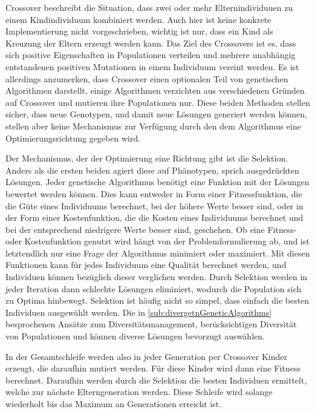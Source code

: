 Crossover beschreibt die Situation, dass zwei oder mehr Elternindividuuen zu einem Kindindividuum kombiniert werden. 
Auch hier ist keine konkrete Implementierung nicht vorgeschrieben, wichtig ist nur, dass ein Kind als Kreuzung der Eltern erzeugt werden kann.
Das Ziel des Crossovers ist es, dass sich positive Eigenschaften in Populationen verteilen und mehrere unabhängig entstandenen positiven Mutationen in einem Individuum vereint werden.
Es ist allerdings anzumerken, dass Crossover einen optionalen Teil von genetischen Algorithmen darstellt, einige Algorithmen%
verzichten aus verschiedenen Gründen auf Crossover und mutieren ihre Populationen nur.
Diese beiden Methoden stellen sicher, dass neue Genotypen, und damit neue Lösungen generiert werden können, stellen aber keine Mechanismus zur Verfügung durch den dem Algorithmus eine Optimierungsrichtung gegeben wird.

Der Mechanismus, der der Optimierung eine Richtung gibt ist die Selektion.
Anders als die ersten beiden agiert diese auf Phänotypen, sprich ausgedrückten Lösungen.
Jeder genetische Algorithmus benötigt eine Funktion mit der Lösungen bewertet werden können.
Dies kann entweder in Form einer Fitnessfunktion, die die Güte eines Individuums berechnet, bei der höhere Werte besser sind, oder in der Form einer Kostenfunktion, die die Kosten eines Individuums berechnet und bei der entsprechend niedrigere Werte besser sind, geschehen.
Ob eine Fitness- oder Kostenfunktion genutzt wird hängt von der Problemformulierung ab, und ist letztendlich nur eine Frage der Algorithmus minimiert oder maximiert.
Mit diesen Funktionen kann für jedes Individuum eine Qualität berechnet werden, und Individuen können bezüglich dieser verglichen werden.
Durch Selektion werden in jeder Iteration dann schlechte Lösungen eliminiert, wodurch die Population sich zu Optima hinbewegt.
Selektion ist häufig nicht so simpel, dass einfach die besten Individuen ausgewählt werden.
Die in \ref{sub:divergetnGeneticAlgorithms} besprochenen Ansätze zum Diversitätsmanagement, berücksichtigen Diversität von Populationen und können diverse Lösungen bevorzugt auswählen.

In der Gesamtschleife werden also in jeder Generation per Crossover Kinder erzeugt, die daraufhin mutiert werden.
Für diese Kinder wird dann eine Fitness berechnet.
Daraufhin werden durch die Selektion die besten Individuen ermittelt, welche zur nächste Elterngeneration werden.
Diese Schleife wird solange wiederholt bis das Maximum an Generationen erreicht ist.

